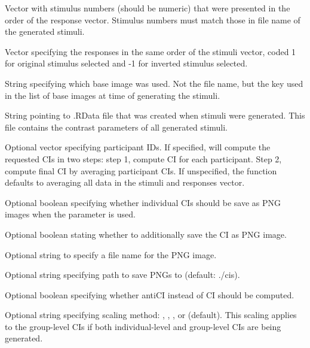 \documentclass[letterpaper]{book}
\begin{document}
\begin{Arguments}
\begin{ldescription}
\item[\code{stimuli}] Vector with stimulus numbers (should be numeric) that were presented in the order of the response vector. Stimulus numbers must match those in file name of the generated stimuli.

\item[\code{responses}] Vector specifying the responses in the same order of the stimuli vector, coded 1 for original stimulus selected and -1 for inverted stimulus selected.

\item[\code{baseimage}] String specifying which base image was used. Not the file name, but the key used in the list of base images at time of generating the stimuli.

\item[\code{rdata}] String pointing to .RData file that was created when stimuli were generated. This file contains the contrast parameters of all generated stimuli.

\item[\code{participants}] Optional vector specifying participant IDs. If specified, will compute the requested CIs in two steps: step 1, compute CI for each participant. Step 2, compute final CI by averaging participant CIs. If unspecified, the function defaults to averaging all data in the stimuli and responses vector.

\item[\code{save\_individual\_cis}] Optional boolean specifying whether individual CIs should be save as PNG images when the  parameter is used.

\item[\code{save\_as\_png}] Optional boolean stating whether to additionally save the CI as PNG image.

\item[\code{filename}] Optional string to specify a file name for the PNG image.

\item[\code{targetpath}] Optional string specifying path to save PNGs to (default: ./cis).

\item[\code{antiCI}] Optional boolean specifying whether antiCI instead of CI should be computed.

\item[\code{scaling}] Optional string specifying scaling method: , , , or  (default). This scaling applies to the group-level CIs if both individual-level and group-level CIs are being generated.


\end{ldescription}
\end{Arguments}
\end{document}
